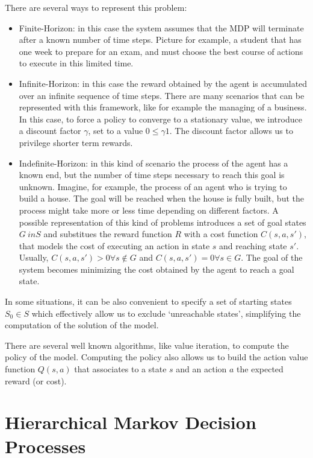 There are several ways to represent this problem:
\begin{itemize}
\item Finite-Horizon: in this case the system assumes that the MDP will terminate after a known number of time steps. Picture for example, a student that has one week to prepare for an exam, and must choose the best course of actions to execute in this limited time.
\item Infinite-Horizon: in this case the reward obtained by the agent is accumulated over an infinite sequence of time steps. There are many scenarios that can be represented with this framework, like for example the managing of a business. In this case, to force a policy to converge to a stationary value, we introduce a discount factor $\gamma$, set to a value $0 \leq \gamma 1$. The discount factor allows us to privilege shorter term rewards.
\item Indefinite-Horizon: in this kind of scenario the process of the agent has a known end, but the number of time steps necessary to reach this goal is unknown. Imagine, for example, the process of an agent who is trying to build a house. The goal will be reached when the house is fully built, but the process might take more or less time depending on different factors.  A possible representation of this kind of problems introduces a set of goal states $G \ in S$ and substitues the reward function $R$ with a cost function $C(s,a,s')$, that models the cost of executing an action in state $s$ and reaching state $s'$. Usually, $C(s,a,s')>0 \forall s \not \in G$ and $C(s,a,s')=0 \forall s \in G$. The goal of the system becomes minimizing the cost obtained by the agent to reach a goal state.
\end{itemize}

In some situations, it can be also convenient to specify a set of starting states $S_0 \in S$ which effectively allow us to exclude `unreachable states', simplifying the computation of the solution of the model.

There are several well known algorithms, like value iteration, to compute the policy of the model. Computing the policy also allows us to build the action value function \(Q(s,a)\) that associates to a state $s$ and an action $a$ the expected reward (or cost). 

\section{Hierarchical Markov Decision Processes}

